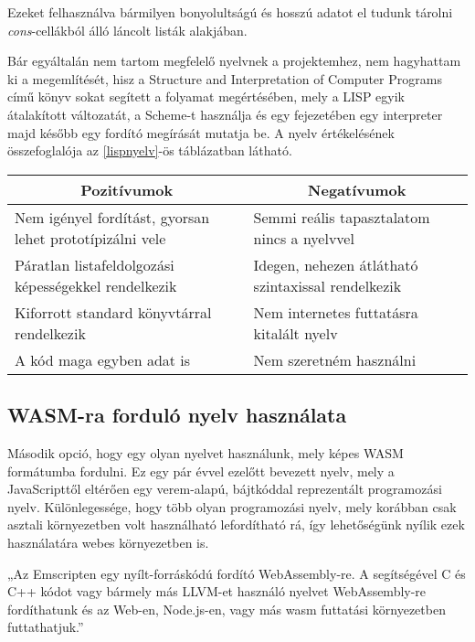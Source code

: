 Ezeket felhasználva bármilyen bonyolultságú és hosszú adatot el tudunk tárolni \textit{cons}-cellákból álló láncolt listák alakjában. 

Bár egyáltalán nem tartom megfelelő nyelvnek a projektemhez, nem hagyhattam ki a megemlítését, hisz a Structure and Interpretation of Computer Programs\cite{sicp} című könyv sokat segített a folyamat megértésében, mely a LISP egyik átalakított változatát, a Scheme-t használja és egy fejezetében egy interpreter majd később egy fordító megírását mutatja be. A nyelv értékelésének összefoglalója az \ref{lispnyelv}-ös táblázatban látható.

\begin{center}
  \begin{tabularx}{\textwidth}{X X}
    \hline
    \multicolumn{1}{c}{\bfseries{Pozitívumok}}               & \multicolumn{1}{c}{\bfseries{Negatívumok}}              \\
    \hline
    Nem igényel fordítást, gyorsan lehet prototípizálni vele & Semmi reális tapasztalatom nincs a nyelvvel             \\
    Páratlan listafeldolgozási képességekkel rendelkezik & Idegen, nehezen átlátható szintaxissal rendelkezik      \\    
    Kiforrott standard könyvtárral rendelkezik & Nem internetes futtatásra kitalált nyelv \\               
    A kód maga egyben adat is & Nem szeretném használni                                 \\
    \hline
  \end{tabularx}
\end{center}

\subsection{WASM-ra forduló nyelv használata}

Második opció, hogy egy olyan nyelvet használunk, mely képes WASM formátumba fordulni. Ez egy pár évvel ezelőtt bevezett nyelv, mely a JavaScripttől eltérően egy verem-alapú, bájtkóddal reprezentált programozási nyelv. Különlegessége, hogy több olyan programozási nyelv, mely korábban csak asztali környezetben volt használható lefordítható rá, így lehetőségünk nyílik ezek használatára webes környezetben is.

„Az Emscripten egy nyílt-forráskódú fordító WebAssembly-re. A segítségével C és C++ kódot vagy bármely más LLVM-et használó nyelvet WebAssembly-re fordíthatunk és az Web-en, Node.js-en, vagy más wasm futtatási környezetben futtathatjuk.”\cite{emscripten}

